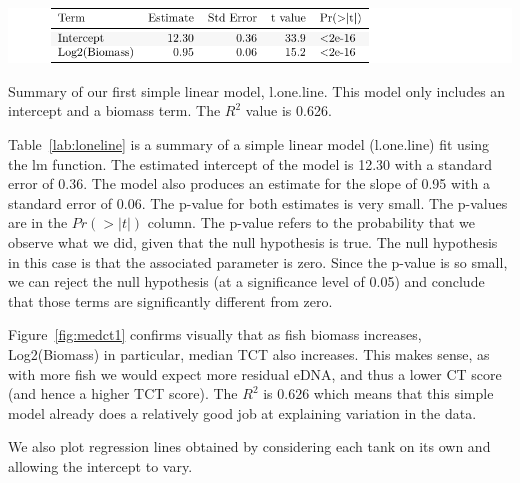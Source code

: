 %


\begin{table}[H]
\includegraphics{Chapter3Images/lonelinekable.pdf}
\caption{Summary of our first simple linear model,  l.one.line. This model only includes an intercept and a biomass term. The $R^{2}$ value is 0.626.}
\label{lab:loneline}
\end{table}


Table~\ref{lab:loneline} is a summary of a simple linear model (l.one.line)  fit using the lm function. The estimated intercept of the model is 12.30 with a standard error of 0.36. The model also produces an estimate for the slope of 0.95 with a standard error of 0.06.  The p-value for both estimates is very small. The p-values are in the $Pr(>|t|)$ column. The p-value refers to the probability that we observe what we did, given that the null hypothesis is true. The null hypothesis in this case is that the associated parameter is zero. Since the p-value is so small, we can reject the null hypothesis (at a significance level of 0.05) and conclude that those terms are significantly different from zero. 

\vspace{12pt}


Figure~\ref{fig:medct1} confirms visually that as fish biomass increases, Log2(Biomass) in particular, median TCT also increases. This makes sense, as with more fish we would expect more residual eDNA, and thus a lower CT score (and hence a higher TCT score). The $R^{2}$ is $0.626$ which means that this simple model already does a relatively good job at explaining variation in the data.

\newpage

We also plot regression lines obtained by considering each tank on its own and allowing the intercept to vary. 


